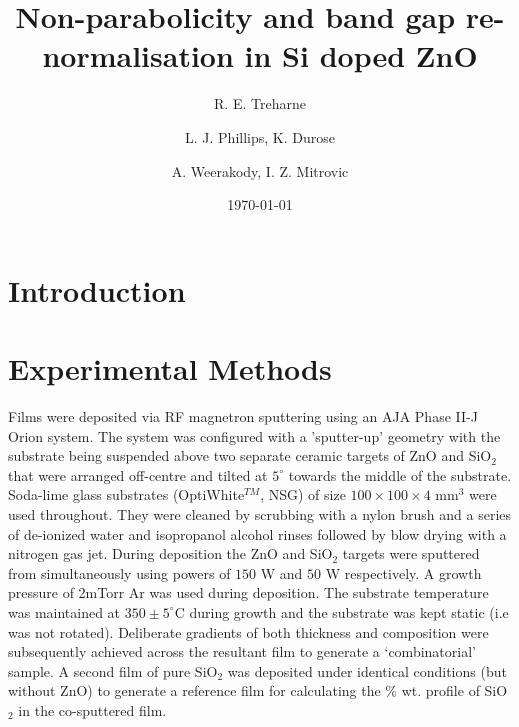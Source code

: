 \documentclass[aps,prl,preprint,showpacs,showkeys,linenumbers]{revtex4-1}
\begin{document}
\title{Non-parabolicity and band gap re-normalisation in Si doped ZnO}
\author{R. E. Treharne}
\author{L. J. Phillips, K. Durose}
\author{A. Weerakody, I. Z. Mitrovic}
\date{\today}
\begin{abstract}
\end{abstract}
\maketitle

\section{Introduction}



\section{Experimental Methods}

Films were deposited via RF magnetron sputtering using an AJA Phase II-J Orion system. The system was configured with a 'sputter-up' geometry with the substrate being suspended above two separate ceramic targets of ZnO and SiO$_2$ that were arranged off-centre and tilted at $5^{\circ}$ towards the middle of the substrate.  Soda-lime glass substrates (OptiWhite$^{TM}$, NSG) of size $100\times100\times4$ mm$^{3}$ were used throughout. They were cleaned by scrubbing with a nylon brush and a series of de-ionized water and isopropanol alcohol rinses followed by blow drying with a nitrogen gas jet. During deposition the ZnO and SiO$_2$ targets were sputtered from simultaneously using powers of $150$ W and $50$ W respectively. A growth pressure of 2mTorr Ar was used during deposition. The substrate temperature was maintained at $350\pm5^{\circ}$C during growth and the substrate was kept static (i.e was not rotated). Deliberate gradients of both thickness and composition were subsequently achieved across the resultant film to generate a `combinatorial' sample. A second film of pure SiO$_{2}$ was deposited under identical conditions (but without ZnO) to generate a reference film for calculating the \% wt. profile of SiO$_{2}$ in the co-sputtered film.
\end{document}
